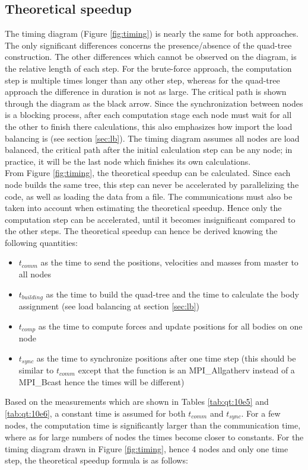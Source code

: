 \subsection{Theoretical speedup}
The timing diagram (Figure \ref{fig:timing}) is nearly the same for both approaches. The only significant differences concerns the presence/absence of the quad-tree construction. The other differences which cannot be observed on the diagram, is the relative length of each step. For the brute-force approach, the computation step is multiple times longer than any other step, whereas for the quad-tree approach the difference in duration is not as large. The critical path is shown through the diagram as the black arrow. Since the synchronization between nodes is a blocking process, after each computation stage each node must wait for all the other to finish there calculations, this also emphasizes how import the load balancing is (see section \ref{sec:lb}). The timing diagram assumes all nodes are load balanced, the critical path after the initial calculation step can be any node; in practice, it will be the last node which finishes its own calculations.\\
From Figure \ref{fig:timing}, the theoretical speedup can be calculated. Since each node builds the same tree, this step can never be accelerated by parallelizing the code, as well as loading the data from a file. The communications must also be taken into account when estimating the theoretical speedup. Hence only the computation step can be accelerated, until it becomes insignificant compared to the other steps. The theoretical speedup can hence be derived knowing the following quantities:
\begin{itemize}
\item $t_{comm}$ as the time to send the positions, velocities and masses from master to all nodes
\item  $t_{building}$ as the time to build the quad-tree and the time to calculate the body assignment (see load balancing at section \ref{sec:lb})
\item $t_{comp}$ as the time to compute forces and update positions for all bodies on one node
\item $t_{sync}$ as the time to synchronize positions after one time step (this should be similar to $t_{comm}$ except that the function is an MPI\_Allgatherv instead of a MPI\_Bcast hence the times will be different)
\end{itemize}
Based on the measurements which are shown in Tables \ref{tab:qt:10e5} and \ref{tab:qt:10e6}, a constant time is assumed for both $t_{comm}$ and $t_{sync}$. For a few nodes, the computation time is significantly larger than the communication time, where as for large numbers of nodes the times become closer to constants. For the timing diagram drawn in Figure \ref{fig:timing}, hence 4 nodes and only one time step, the theoretical speedup formula is as follows:

